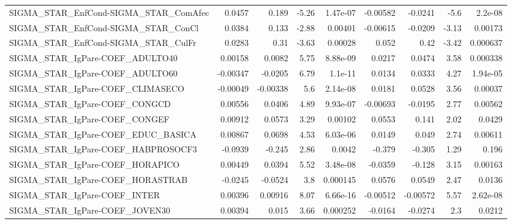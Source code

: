 \begin{tabular}{lrrrrrrrr}
SIGMA\_STAR\_EnfCond-SIGMA\_STAR\_ComAfec  &      0.0457 &        0.189 &    -5.26 & 1.47e-07 &   -0.00582 &     -0.0241 &         -5.6 &       2.2e-08 \\
SIGMA\_STAR\_EnfCond-SIGMA\_STAR\_ConCl    &      0.0384 &        0.133 &    -2.88 &  0.00401 &   -0.00615 &     -0.0209 &        -3.13 &       0.00173 \\
SIGMA\_STAR\_EnfCond-SIGMA\_STAR\_CulFr    &      0.0283 &         0.31 &    -3.63 &  0.00028 &      0.052 &        0.42 &        -3.42 &      0.000637 \\
SIGMA\_STAR\_IgPare-COEF\_ADULTO40        &     0.00158 &       0.0082 &     5.75 & 8.88e-09 &     0.0217 &      0.0474 &         3.58 &      0.000338 \\
SIGMA\_STAR\_IgPare-COEF\_ADULTO60        &    -0.00347 &      -0.0205 &     6.79 &  1.1e-11 &     0.0134 &      0.0333 &         4.27 &      1.94e-05 \\
SIGMA\_STAR\_IgPare-COEF\_CLIMASECO       &    -0.00049 &     -0.00338 &      5.6 & 2.14e-08 &     0.0181 &      0.0528 &         3.56 &       0.00037 \\
SIGMA\_STAR\_IgPare-COEF\_CONGCD          &     0.00556 &       0.0406 &     4.89 & 9.93e-07 &   -0.00693 &     -0.0195 &         2.77 &       0.00562 \\
SIGMA\_STAR\_IgPare-COEF\_CONGEF          &     0.00912 &       0.0573 &     3.29 &  0.00102 &     0.0553 &       0.141 &         2.02 &        0.0429 \\
SIGMA\_STAR\_IgPare-COEF\_EDUC\_BASICA     &     0.00867 &       0.0698 &     4.53 & 6.03e-06 &     0.0149 &       0.049 &         2.74 &       0.00611 \\
SIGMA\_STAR\_IgPare-COEF\_HABPROSOCF3     &     -0.0939 &       -0.245 &     2.86 &   0.0042 &     -0.379 &      -0.305 &         1.29 &         0.196 \\
SIGMA\_STAR\_IgPare-COEF\_HORAPICO        &     0.00449 &       0.0394 &     5.52 & 3.48e-08 &    -0.0359 &      -0.128 &         3.15 &       0.00163 \\
SIGMA\_STAR\_IgPare-COEF\_HORASTRAB       &     -0.0245 &      -0.0524 &      3.8 & 0.000145 &     0.0576 &      0.0549 &         2.47 &        0.0136 \\
SIGMA\_STAR\_IgPare-COEF\_INTER           &     0.00396 &      0.00916 &     8.07 & 6.66e-16 &   -0.00512 &    -0.00572 &         5.57 &      2.62e-08 \\
SIGMA\_STAR\_IgPare-COEF\_JOVEN30         &     0.00394 &        0.015 &     3.66 & 0.000252 &    -0.0164 &     -0.0274 &          2.3 &        0.0212 \\

\end{tabular}
